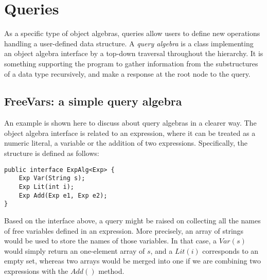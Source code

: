 \section{Queries}\label{sec:queries}

As a specific type of object algebras, queries allow users to define
new operations handling a user-defined data structure. A \textit{query
  algebra} is a class implementing an object algebra interface by a
top-down traversal throughout the hierarchy. It is something
supporting the program to gather information from the substructures of
a data type recursively, and make a response at the root node to the
query.

\subsection{FreeVars: a simple query algebra}\label{subsec:freevars}

An example is shown here to discuss about query algebras in a clearer
way. The object algebra interface is related to an expression, where
it can be treated as a numeric literal, a variable or the addition of
two expressions. Specifically, the structure is defined as follows:

\begin{lstlisting}[numbers=none]
public interface ExpAlg<Exp> {
    Exp Var(String s);
    Exp Lit(int i);
    Exp Add(Exp e1, Exp e2);
}
\end{lstlisting}

Based on the interface above, a query might be raised on collecting
all the names of free variables defined in an expression. More
precisely, an array of strings would be used to store the names of
those variables. In that case, a $Var(s)$ would simply return an
one-element array of $s$, and a $Lit(i)$ corresponds to an empty set,
whereas two arrays would be merged into one if we are combining two
expressions with the $Add()$ method.

